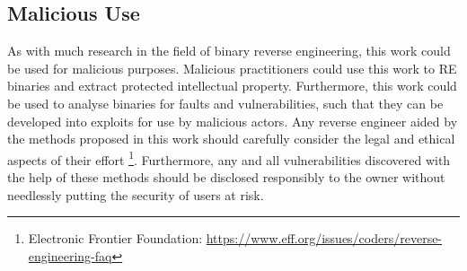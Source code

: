 \subsection{Malicious Use}
As with much research in the field of binary reverse engineering, this work could be used for malicious purposes. Malicious practitioners could use this work to RE binaries and extract protected intellectual property. Furthermore, this work could be used to analyse binaries for faults and vulnerabilities, such that they can be developed into exploits for use by malicious actors. Any reverse engineer aided by the methods proposed in this work should carefully consider the legal and ethical aspects of their effort \footnote{Electronic Frontier Foundation: \url{https://www.eff.org/issues/coders/reverse-engineering-faq}}. Furthermore, any and all vulnerabilities discovered with the help of these methods should be disclosed responsibly to the owner without needlessly putting the security of users at risk. 
